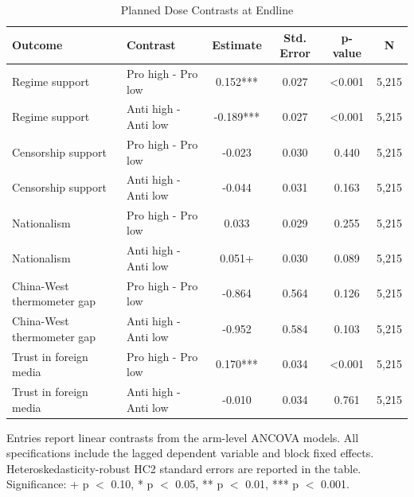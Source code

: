 \begin{table}[H]
\centering
\caption{Planned Dose Contrasts at Endline}
\label{tab:planned_contrasts_t1}
\footnotesize
\begin{threeparttable}
\begin{tabular}{llcccc}
\toprule
Outcome & Contrast & Estimate & Std. Error & p-value & N \\
\midrule
Regime support & Pro high - Pro low & 0.152*** & 0.027 & <0.001 & 5,215 \\
Regime support & Anti high - Anti low & -0.189*** & 0.027 & <0.001 & 5,215 \\
Censorship support & Pro high - Pro low & -0.023 & 0.030 & 0.440 & 5,215 \\
Censorship support & Anti high - Anti low & -0.044 & 0.031 & 0.163 & 5,215 \\
Nationalism & Pro high - Pro low & 0.033 & 0.029 & 0.255 & 5,215 \\
Nationalism & Anti high - Anti low & 0.051+ & 0.030 & 0.089 & 5,215 \\
China-West thermometer gap & Pro high - Pro low & -0.864 & 0.564 & 0.126 & 5,215 \\
China-West thermometer gap & Anti high - Anti low & -0.952 & 0.584 & 0.103 & 5,215 \\
Trust in foreign media & Pro high - Pro low & 0.170*** & 0.034 & <0.001 & 5,215 \\
Trust in foreign media & Anti high - Anti low & -0.010 & 0.034 & 0.761 & 5,215 \\
\bottomrule
\end{tabular}
\begin{tablenotes}[flushleft]
\footnotesize
\item Entries report linear contrasts from the arm-level ANCOVA models. All specifications include the lagged dependent variable and block fixed effects. Heteroskedasticity-robust HC2 standard errors are reported in the table. Significance: + p $<$ 0.10, * p $<$ 0.05, ** p $<$ 0.01, *** p $<$ 0.001.
\end{tablenotes}
\end{threeparttable}
\end{table}
